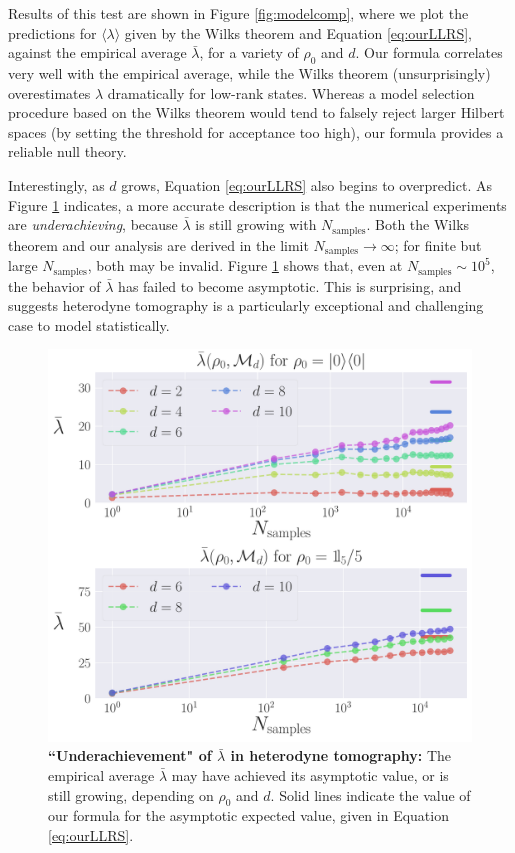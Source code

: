 \documentclass[aps,pra, twocolumn]{revtex4-1}
\begin{document}
Results of this test are shown in Figure \ref{fig:modelcomp}, where we plot the predictions for $\langle \lambda \rangle$ given by the Wilks theorem and Equation \eqref{eq:ourLLRS}, against the empirical average $\bar\lambda$, for a variety of $\rho_{0}$ and $d$. Our formula correlates very well with the empirical average, while the Wilks theorem (unsurprisingly) overestimates $\lambda$ dramatically for low-rank states.  Whereas a model selection procedure based on the Wilks theorem would tend to falsely reject larger Hilbert spaces (by setting the threshold for acceptance too high), our formula provides a reliable null theory.



Interestingly, as $d$ grows, Equation \eqref{eq:ourLLRS} also begins to overpredict. As Figure \ref{fig:totalcontrib} indicates, a more accurate description is that the numerical experiments are \emph{underachieving}, because $\bar\lambda$ is still growing with $N_{\mathrm{samples}}$.  Both the Wilks theorem and our analysis are derived in the limit $N_{\mathrm{samples}} \rightarrow \infty$; for finite but large $N_{\mathrm{samples}}$, both may be invalid.  Figure \ref{fig:totalcontrib} shows that, even at $N_{\mathrm{samples}}\sim 10^{5}$, the behavior of $\bar{\lambda}$ has failed to become asymptotic. This is surprising, and suggests heterodyne tomography is a particularly exceptional and challenging case to model statistically. 

\begin{figure}
  \includegraphics[width=.9\columnwidth]{Images/Figure_12.pdf}
 \caption{\textbf{``Underachievement" of $\bar{\lambda}$ in heterodyne tomography:} The empirical average $\bar{\lambda}$  may have achieved its asymptotic value, or is still 
growing, depending on $\rho_{0}$ and $d$. Solid lines indicate the value of our formula
for the asymptotic expected value, given in Equation \eqref{eq:ourLLRS}.}
\label{fig:totalcontrib}
\end{figure}
\end{document}
